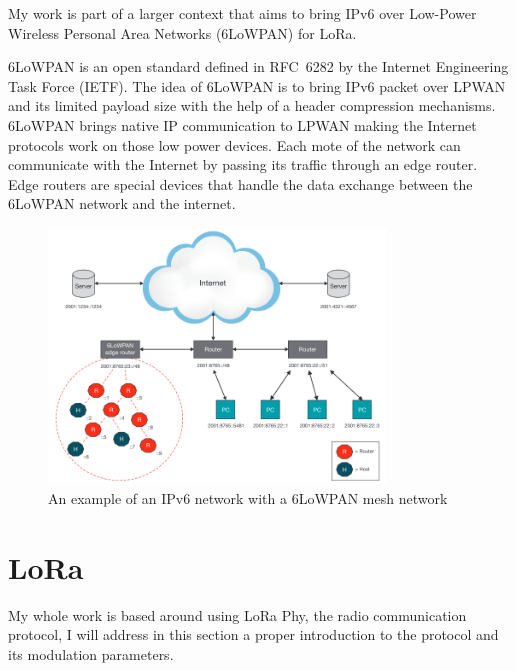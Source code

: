My work is part of a larger context that aims to bring IPv6 over Low-Power
Wireless Personal Area Networks (6LoWPAN) for LoRa.

6LoWPAN is an open standard defined in RFC~6282 by the Internet Engineering
Task Force (IETF).
The idea of 6LoWPAN is to bring IPv6 packet over LPWAN and its limited payload
size with the help of a header compression mechanisms.
6LoWPAN brings native IP communication to LPWAN making the Internet protocols
work on those low power devices.
Each mote of the network can communicate with the Internet by passing its
traffic through an edge router.
Edge routers are special devices that handle the data exchange between the
6LoWPAN network and the internet.

\begin{figure}[H]
  \centering
  \includegraphics[width=0.8\textwidth]{thesis.tex/chapters/context/fig/6lowpan.png}
  \caption{An example of an IPv6 network with a 6LoWPAN mesh network\cite{olsson20146lowpan}\label{fig:6lowpan}}
\end{figure}


\section{LoRa\label{section:lora}}

My whole work is based around using LoRa Phy, the radio communication protocol,
I will address in this section a proper introduction to the protocol and its
modulation parameters.

